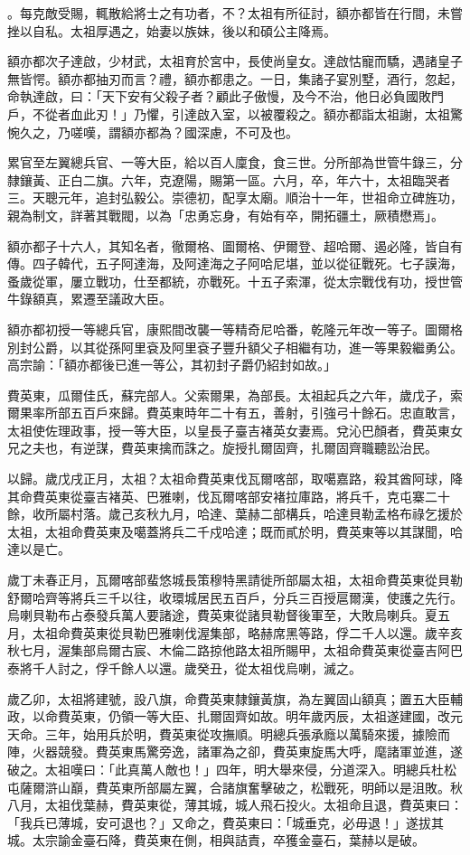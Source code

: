 \begin{pinyinscope}
。每克敵受賜，輒散給將士之有功者，不？太祖有所征討，額亦都皆在行間，未嘗挫以自私。太祖厚遇之，始妻以族妹，後以和碩公主降焉。

額亦都次子達啟，少材武，太祖育於宮中，長使尚皇女。達啟怙寵而驕，遇諸皇子無皆愕。額亦都抽刃而言？禮，額亦都患之。一日，集諸子宴別墅，酒行，忽起，命執達啟，曰：「天下安有父殺子者？顧此子傲慢，及今不治，他日必負國敗門戶，不從者血此刃！」乃懼，引達啟入室，以被覆殺之。額亦都詣太祖謝，太祖驚惋久之，乃嗟嘆，謂額亦都為？國深慮，不可及也。

累官至左翼總兵官、一等大臣，給以百人廩食，食三世。分所部為世管牛錄三，分隸鑲黃、正白二旗。六年，克遼陽，賜第一區。六月，卒，年六十，太祖臨哭者三。天聰元年，追封弘毅公。崇德初，配享太廟。順治十一年，世祖命立碑旌功，親為制文，詳著其戰閥，以為「忠勇忘身，有始有卒，開拓疆土，厥積懋焉」。

額亦都子十六人，其知名者，徹爾格、圖爾格、伊爾登、超哈爾、遏必隆，皆自有傳。四子韓代，五子阿達海，及阿達海之子阿哈尼堪，並以從征戰死。七子謨海，蚤歲從軍，屢立戰功，仕至都統，亦戰死。十五子索渾，從太宗戰伐有功，授世管牛錄額真，累遷至議政大臣。

額亦都初授一等總兵官，康熙間改襲一等精奇尼哈番，乾隆元年改一等子。圖爾格別封公爵，以其從孫阿里袞及阿里袞子豐升額父子相繼有功，進一等果毅繼勇公。高宗諭：「額亦都後已進一等公，其初封子爵仍紹封如故。」

費英東，瓜爾佳氏，蘇完部人。父索爾果，為部長。太祖起兵之六年，歲戊子，索爾果率所部五百戶來歸。費英東時年二十有五，善射，引強弓十餘石。忠直敢言，太祖使佐理政事，授一等大臣，以皇長子臺吉褚英女妻焉。兌沁巴顏者，費英東女兄之夫也，有逆謀，費英東擒而誅之。旋授扎爾固齊，扎爾固齊職聽訟治民。

以歸。歲戊戌正月，太祖？太祖命費英東伐瓦爾喀部，取噶嘉路，殺其酋阿球，降其命費英東從臺吉褚英、巴雅喇，伐瓦爾喀部安褚拉庫路，將兵千，克屯寨二十餘，收所屬村落。歲己亥秋九月，哈達、葉赫二部構兵，哈達貝勒孟格布祿乞援於太祖，太祖命費英東及噶蓋將兵二千戍哈達；既而貳於明，費英東等以其謀聞，哈達以是亡。

歲丁未春正月，瓦爾喀部蜚悠城長策穆特黑請徙所部屬太祖，太祖命費英東從貝勒舒爾哈齊等將兵三千以往，收環城居民五百戶，分兵三百授扈爾漢，使護之先行。烏喇貝勒布占泰發兵萬人要諸途，費英東從諸貝勒督後軍至，大敗烏喇兵。夏五月，太祖命費英東從貝勒巴雅喇伐渥集部，略赫席黑等路，俘二千人以還。歲辛亥秋七月，渥集部烏爾古宸、木倫二路掠他路太祖所賜甲，太祖命費英東從臺吉阿巴泰將千人討之，俘千餘人以還。歲癸丑，從太祖伐烏喇，滅之。

歲乙卯，太祖將建號，設八旗，命費英東隸鑲黃旗，為左翼固山額真；置五大臣輔政，以命費英東，仍領一等大臣、扎爾固齊如故。明年歲丙辰，太祖遂建國，改元天命。三年，始用兵於明，費英東從攻撫順。明總兵張承廕以萬騎來援，據險而陣，火器競發。費英東馬驚旁逸，諸軍為之卻，費英東旋馬大呼，麾諸軍並進，遂破之。太祖嘆曰：「此真萬人敵也！」四年，明大舉來侵，分道深入。明總兵杜松屯薩爾滸山巔，費英東所部屬左翼，合諸旗奮擊破之，松戰死，明師以是沮敗。秋八月，太祖伐葉赫，費英東從，薄其城，城人飛石投火。太祖命且退，費英東曰：「我兵已薄城，安可退也？」又命之，費英東曰：「城垂克，必毋退！」遂拔其城。太宗諭金臺石降，費英東在側，相與詰責，卒獲金臺石，葉赫以是破。


\end{pinyinscope}
